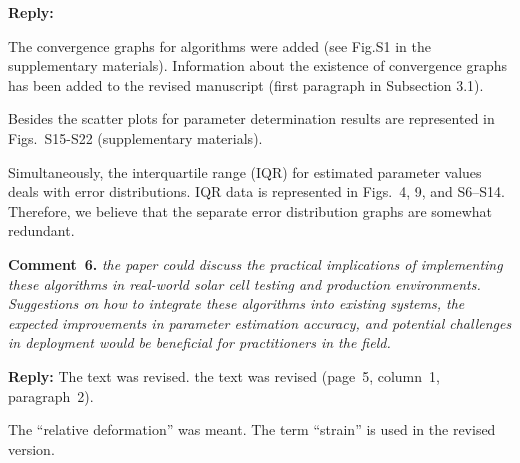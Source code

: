 \documentclass[a4paper,fleqn]{cas-sc}
\begin{document}
\noindent
\textcolor[rgb]{0.51,0.00,0.00}{\textbf{Reply:}}

The convergence graphs for  algorithms were added (see Fig.S1 in the supplementary materials).
Information about the existence of convergence graphs has been added to the revised manuscript (first paragraph in Subsection 3.1).

Besides the scatter plots for parameter determination results are represented in Figs.~S15-S22 (supplementary materials).

Simultaneously, the interquartile range (IQR) for estimated parameter values deals with error distributions.
IQR data is represented in Figs.~4, 9, and S6--S14.
Therefore, we believe that the separate error distribution graphs are somewhat redundant.


\vspace{1cm}
\noindent
\textcolor[rgb]{0.00,0.50,1.00}{\textbf{Comment~6.}}
\emph{ the paper could discuss the practical implications of implementing these algorithms
in real-world solar cell testing and production environments.
Suggestions on how to integrate these algorithms into existing systems, the expected improvements
in parameter estimation accuracy, and potential challenges in deployment would be beneficial for practitioners in the field.}

\noindent
\textcolor[rgb]{0.51,0.00,0.00}{\textbf{Reply:}}
The text was revised.
the text was revised (page~5, column~1, paragraph~2).

The ``relative deformation'' was meant.
The term ``strain'' is used in the revised version.



\end{document}
